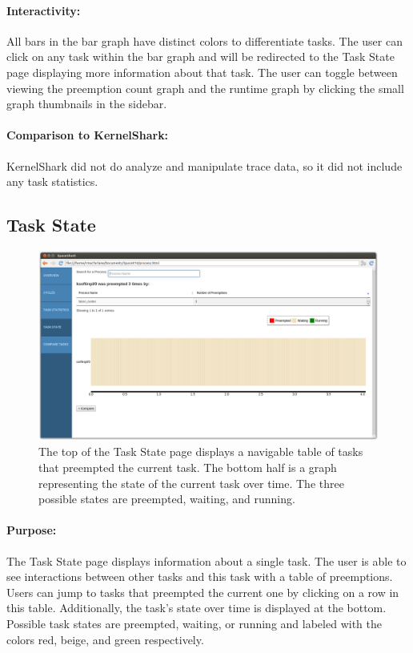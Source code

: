 \documentclass{hmcclinic}
\begin{document}
\paragraph{Interactivity:}
All bars in the bar graph have distinct colors to differentiate tasks. The user can click on any task within the bar graph and will be redirected to the Task State page displaying more information about that task. The user can toggle between viewing the preemption count graph and the runtime graph by clicking the small graph thumbnails in the sidebar.

\paragraph{Comparison to KernelShark:} KernelShark did not do analyze and manipulate trace data, so it did not include any task statistics. 


  \subsection{Task State}

  \begin{figure}[H]
  \includegraphics[scale=0.25]{task-state-page.png}
  \caption{The top of the Task State page displays a navigable table of tasks
  that preempted the current task. The bottom half is a graph representing the
state of the current task over time. The three possible states are preempted,
waiting, and running.}
\end{figure}

\paragraph{Purpose:}
    The Task State page displays information about a single task. The user is
    able to see interactions between other tasks and this task with a table of
    preemptions. Users can jump to tasks that preempted the current one by
    clicking on a row in this table. Additionally, the task's state over time
    is displayed at the bottom. Possible task states are preempted, waiting, or
    running and labeled with the colors red, beige, and green respectively. 
\end{document}

